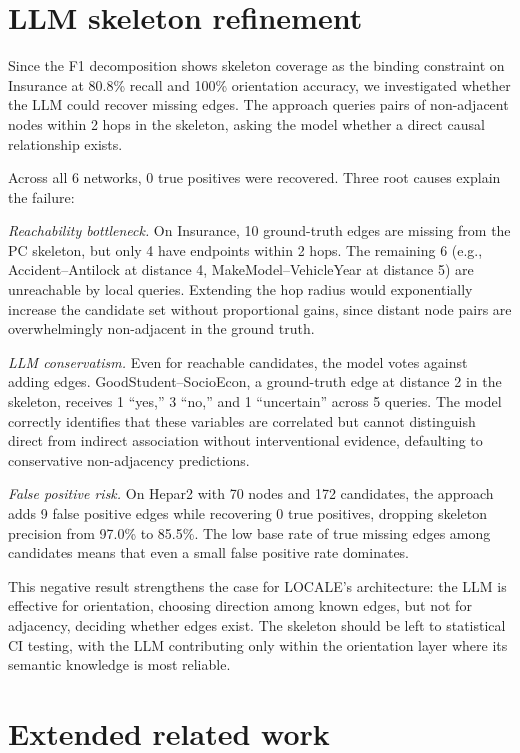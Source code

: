 \documentclass{article} %
\begin{document}
\section{LLM skeleton refinement}
\label{app:skeleton-refine}

Since the F1 decomposition shows skeleton coverage as the binding constraint on Insurance at 80.8\% recall and 100\% orientation accuracy, we investigated whether the LLM could recover missing edges. The approach queries pairs of non-adjacent nodes within 2 hops in the skeleton, asking the model whether a direct causal relationship exists.

Across all 6 networks, 0 true positives were recovered. Three root causes explain the failure:

\textit{Reachability bottleneck.} On Insurance, 10 ground-truth edges are missing from the PC skeleton, but only 4 have endpoints within 2 hops. The remaining 6 (e.g., Accident--Antilock at distance 4, MakeModel--VehicleYear at distance 5) are unreachable by local queries. Extending the hop radius would exponentially increase the candidate set without proportional gains, since distant node pairs are overwhelmingly non-adjacent in the ground truth.

\textit{LLM conservatism.} Even for reachable candidates, the model votes against adding edges. GoodStudent--SocioEcon, a ground-truth edge at distance 2 in the skeleton, receives 1 ``yes,'' 3 ``no,'' and 1 ``uncertain'' across 5 queries. The model correctly identifies that these variables are correlated but cannot distinguish direct from indirect association without interventional evidence, defaulting to conservative non-adjacency predictions.

\textit{False positive risk.} On Hepar2 with 70 nodes and 172 candidates, the approach adds 9 false positive edges while recovering 0 true positives, dropping skeleton precision from 97.0\% to 85.5\%. The low base rate of true missing edges among candidates means that even a small false positive rate dominates.

This negative result strengthens the case for LOCALE's architecture: the LLM is effective for orientation, choosing direction among known edges, but not for adjacency, deciding whether edges exist. The skeleton should be left to statistical CI testing, with the LLM contributing only within the orientation layer where its semantic knowledge is most reliable.


\section{Extended related work}
\label{app:extended-rw}
\end{document}
